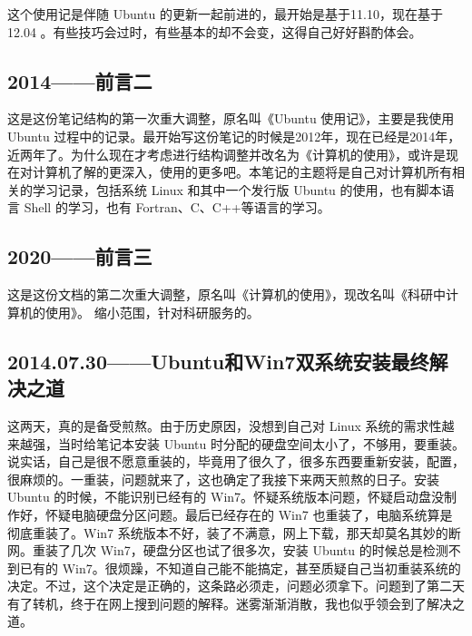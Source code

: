 \documentclass[cn,11pt,chinese,twoside]{elegantbook}
\begin{document}
 这个使用记是伴随 Ubuntu 的更新一起前进的，最开始是基于11.10，现在基于12.04 。有些技巧会过时，有些基本的却不会变，这得自己好好斟酌体会。
 



\subsection*{2014——前言二}
这是这份笔记结构的第一次重大调整，原名叫《Ubuntu 使用记》，主要是我使用 Ubuntu 过程中的记录。最开始写这份笔记的时候是2012年，现在已经是2014年，近两年了。为什么现在才考虑进行结构调整并改名为《计算机的使用》，或许是现在对计算机了解的更深入，使用的更多吧。本笔记的主题将是自己对计算机所有相关的学习记录，包括系统 Linux 和其中一个发行版 Ubuntu 的使用，也有脚本语言 Shell 的学习，也有 Fortran、C、C++等语言的学习。




\subsection*{2020——前言三}
这是这份文档的第二次重大调整，原名叫《计算机的使用》，现改名叫《科研中计算机的使用》。
缩小范围，针对科研服务的。



\subsection*{2014.07.30——Ubuntu和Win7双系统安装最终解决之道}
这两天，真的是备受煎熬。由于历史原因，没想到自己对 Linux 系统的需求性越来越强，当时给笔记本安装 Ubuntu 时分配的硬盘空间太小了，不够用，要重装。说实话，自己是很不愿意重装的，毕竟用了很久了，很多东西要重新安装，配置，很麻烦的。一重装，问题就来了，这也确定了我接下来两天煎熬的日子。安装 Ubuntu 的时候，不能识别已经有的 Win7。怀疑系统版本问题，怀疑启动盘没制作好，怀疑电脑硬盘分区问题。最后已经存在的 Win7 也重装了，电脑系统算是彻底重装了。Win7 系统版本不好，装了不满意，网上下载，那天却莫名其妙的断网。重装了几次 Win7，硬盘分区也试了很多次，安装 Ubuntu 的时候总是检测不到已有的 Win7。很烦躁，不知道自己能不能搞定，甚至质疑自己当初重装系统的决定。不过，这个决定是正确的，这条路必须走，问题必须拿下。问题到了第二天有了转机，终于在网上搜到问题的解释。迷雾渐渐消散，我也似乎领会到了解决之道。
\end{document}
